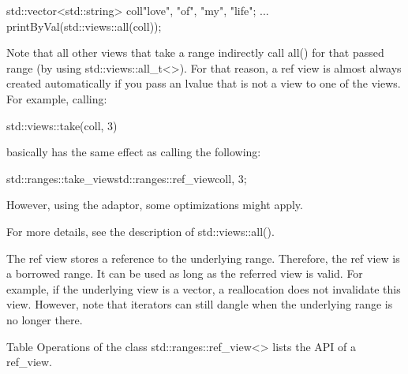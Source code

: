\begin{cpp}
std::vector<std::string> coll{"love", "of", "my", "life"};
...
printByVal(std::views::all(coll));
\end{cpp}

Note that all other views that take a range indirectly call all() for that passed range (by using std::views::all\_t<>). For that reason, a ref view is almost always created automatically if you pass an lvalue that is not a view to one of the views. For example, calling:

\begin{cpp}
std::views::take(coll, 3)
\end{cpp}

basically has the same effect as calling the following:

\begin{cpp}
std::ranges::take_view{std::ranges::ref_view{coll}, 3};
\end{cpp}

However, using the adaptor, some optimizations might apply.

For more details, see the description of std::views::all().


The ref view stores a reference to the underlying range. Therefore, the ref view is a borrowed range. It can be used as long as the referred view is valid. For example, if the underlying view is a vector, a reallocation does not invalidate this view. However, note that iterators can still dangle when the underlying range is no longer there.



Table Operations of the class std::ranges::ref\_view<> lists the API of a ref\_view.

